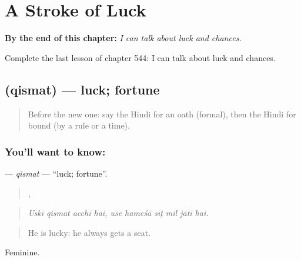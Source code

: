 
\chapter{A Stroke of Luck}
\label{ch:hi-a-stroke-of-luck}

\begin{chapteropening}
\textbf{By the end of this chapter:} \emph{I can talk about luck and chances.}

Complete the last lesson of chapter 544: I can talk about luck and chances.
\end{chapteropening}

\section[\texorpdfstring{\hi{क़िस्मत} (qismat)}{क़िस्मत (qismat)}]{ (qismat) — luck; fortune}

\label{lesson:HI-C544-qismat}



\begin{quote}
Before the new one: say the Hindi for an oath (formal), then the Hindi for bound (by a rule or a time).
\end{quote}

\subsection*{You'll want to know: }
\textbf{} — \emph{qismat} — \textquotedblleft{}luck; fortune\textquotedblright{}.

\begin{quote}
   ,      
\end{quote}

\begin{quote}
\emph{Uskī qismat acchī hai, use hameśā sīṭ mil jātī hai.}
\end{quote}

\begin{quote}
He is lucky: he always gets a seat.
\end{quote}

Feminine.

